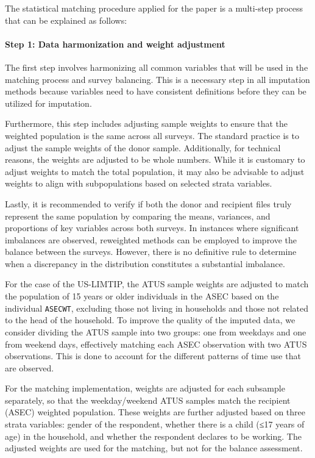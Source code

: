 \documentclass[
  11pt,
]{article}
\let\oldparagraph\paragraph
\renewcommand{\paragraph}[1]{\oldparagraph{#1}\mbox{}}
\begin{document}
The statistical matching procedure applied for the paper is a multi-step
process that can be explained as follows:

\paragraph{Step 1: Data harmonization and weight
adjustment}\label{step-1-data-harmonization-and-weight-adjustment}

The first step involves harmonizing all common variables that will be
used in the matching process and survey balancing. This is a necessary
step in all imputation methods because variables need to have consistent
definitions before they can be utilized for imputation.

Furthermore, this step includes adjusting sample weights to ensure that
the weighted population is the same across all surveys. The standard
practice is to adjust the sample weights of the donor sample.
Additionally, for technical reasons, the weights are adjusted to be
whole numbers. While it is customary to adjust weights to match the
total population, it may also be advisable to adjust weights to align
with subpopulations based on selected strata variables.

Lastly, it is recommended to verify if both the donor and recipient
files truly represent the same population by comparing the means,
variances, and proportions of key variables across both surveys. In
instances where significant imbalances are observed, reweighted methods
can be employed to improve the balance between the surveys. However,
there is no definitive rule to determine when a discrepancy in the
distribution constitutes a substantial imbalance.

For the case of the US-LIMTIP, the ATUS sample weights are adjusted to
match the population of 15 years or older individuals in the ASEC based
on the individual \texttt{ASECWT}, excluding those not living in
households and those not related to the head of the household. To
improve the quality of the imputed data, we consider dividing the ATUS
sample into two groups: one from weekdays and one from weekend days,
effectively matching each ASEC observation with two ATUS observations.
This is done to account for the different patterns of time use that are
observed.

For the matching implementation, weights are adjusted for each subsample
separately, so that the weekday/weekend ATUS samples match the recipient
(ASEC) weighted population. These weights are further adjusted based on
three strata variables: gender of the respondent, whether there is a
child (≤17 years of age) in the household, and whether the respondent
declares to be working. The adjusted weights are used for the matching,
but not for the balance assessment.
\end{document}
